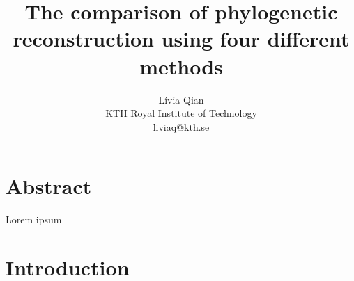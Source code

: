 \documentclass[11pt,twocolumn]{article}
\title{The comparison of phylogenetic reconstruction using four different methods}
\author{Lívia Qian\\KTH Royal Institute of Technology\\liviaq@kth.se}
\begin{document}
\date{}
\maketitle

\section*{Abstract}

Lorem ipsum

\section*{Introduction}


\nocite{*}
\end{document}

